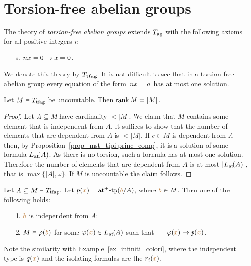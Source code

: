 \documentclass[creche.tex]{subfiles}
\begin{document}
\section{Torsion-free abelian groups}

The theory of \emph{torsion-free abelian groups\/} extends $T_{\rm ag}$ with the following axioms for all positive integers $n$
\begin{itemize}
\item[st] $nx= 0\imp x=0$.
\end{itemize}
We denote this theory by \emph{$T_{\rm\bf tfag}$}. It is not difficult to see that in a torsion-free abelian group every equation of the form $\,nx = a\,$ has at most one solution.


\begin{proposition}
Let $M\models T_{\rm tfag}$ be uncountable. Then $\rank M=|M|$. 
\end{proposition}

\begin{proof}
Let $A\subseteq M$ have cardinality $<|M|$. We claim that $M$ contains some element that is independent from $A$. It suffices to show that the number of elements that are dependent from $A$ is $<|M|$. If $c\in M$ is dependent from $A$ then, by Proposition~\ref{prop_mst_tipi princ_comp}, it is a solution of some formula $\atL(A)$. As there is no torsion, such a formula has at most one solution. Therefore the number of elements that are dependent from $A$ is at most $|\atL(A)|$, that is $\max\big\{|A|,\omega\big\}$. If $M$ is uncountable the claim follows.
\end{proof}

\begin{proposition}\label{prop_mst_tipi princ_comp}
Let $A\subseteq M\models T_{\rm tfag}$.  Let $p({\mr x})=\atpmtp({\mr b}/A)$, where ${\mr b} \in M$. Then one of the following holds:   
\begin{itemize}
\item[1.] ${\mr b}$ is independent from $A$;
\item[2.] $M\models\phi({\mr b})$ for some $\phi({\mr x})\in\atL(A)$ such that $\ \proves\ \phi({\mr x})\imp p({\mr x})$.
\end{itemize}\end{proposition}

Note the similarity with Example~\ref{ex_infiniti_colori}, where the independent type is $q({\mr x})$ and the isolating formulas are the $r_i({\mr x})$. 
\end{document}
